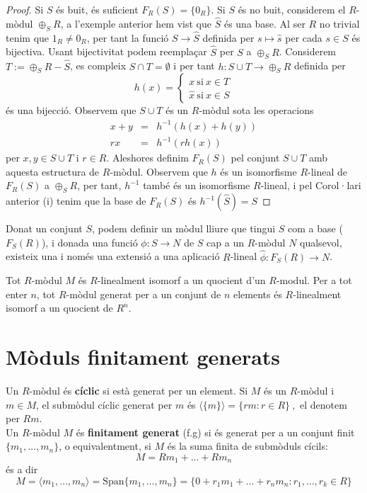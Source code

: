 \begin{proof} Si $S$ és buit, és suficient $F_R(S)=\{0_R\}$. Si $S$ és no buit, considerem el $R$-mòdul $\oplus_S R$, a l'exemple anterior hem vist que $\hat{S}$ és una base. 
 Al ser $R$ no trivial tenim que $1_R \neq 0_R$, per tant la funció $S\rightarrow \hat{S}$ definida per $s\mapsto \hat{s}$ per cada $s\in S$ és bijectiva. Usant bijectivitat podem reemplaçar $\hat{S}$ per $S$ a $\oplus_S R$. Considerem $T:=\oplus_S R - \hat{S}$, es compleix $S\cap T = \emptyset$ i per tant $h: S\cup T \rightarrow \oplus_S R$ definida per 
 $$
 h(x)=
 \begin{cases}
 x \ \text{si} \ x\in T \\
 \hat{x} \ \text{si} \ x\in S
 \end{cases}
 $$
 és una bijecció. Observem que $S\cup T$ és un $R$-mòdul sota les operacions
 \begin{eqnarray*}
 x+y &=& h^{-1}(h(x)+h(y)) \\
 rx &=& h^{-1}(rh(x))
 \end{eqnarray*}
 per $x,y\in S\cup T$ i $r\in R$. Aleshores definim $F_R(S)$ pel conjunt $S\cup T$ amb aquesta estructura de $R$-mòdul. Observem que $h$ és un isomorfisme $R$-lineal de $F_R(S)$ a $\oplus_S R$, per tant, $h^{-1}$ també és un isomorfisme $R$-lineal, i pel Corol·lari anterior (i) tenim que la base de $F_R(S)$ és $h^{-1}(\hat{S})=S$
\end{proof}


\begin{obs} Donat un conjunt $S$, podem definir un mòdul lliure que tingui $S$ com a base ($F_S(R)$), i donada una funció $\phi: S\rightarrow N$ de $S$ cap a un $R$-mòdul $N$ qualsevol, existeix una i només una extensió a una aplicació $R$-lineal $\hat{\phi}: F_S(R)\rightarrow N$.
\end{obs}

\begin{cor}
 Tot $R$-mòdul $M$ és $R$-linealment isomorf a un quocient d'un $R$-modul. Per a tot enter $n$, tot $R$-mòdul generat per a un conjunt de $n$ elements és $R$-linealment isomorf a un quocient de $R^n$.
\end{cor}


\section{Mòduls finitament generats}

\begin{definition} Un $R$-mòdul és \textbf{cíclic} si està generat per un element. Si $M$ és un $R$-mòdul i $m\in M$, el submòdul cíclic generat per $m$ és
$
\langle \{ m \} \rangle = \{ rm : r\in R \} \ ,
$
el denotem per $Rm$. \\
Un $R$-mòdul $M$ és \textbf{finitament generat} (f.g) si és generat per a un conjunt finit $\{ m_1,\dots , m_n \}$, o equivalentment, si $M$ és la suma finita de submòduls cícils:
$$
M=Rm_1+\dots +Rm_n
$$
és a dir 
$$M=\langle m_1, \dots , m_n \rangle =\text{Span} \{ m_1,\dots , m_n\}=\{0+r_1m_1+\dots +r_nm_n : r_1,\dots, r_k \in R \}$$
\end{definition}


